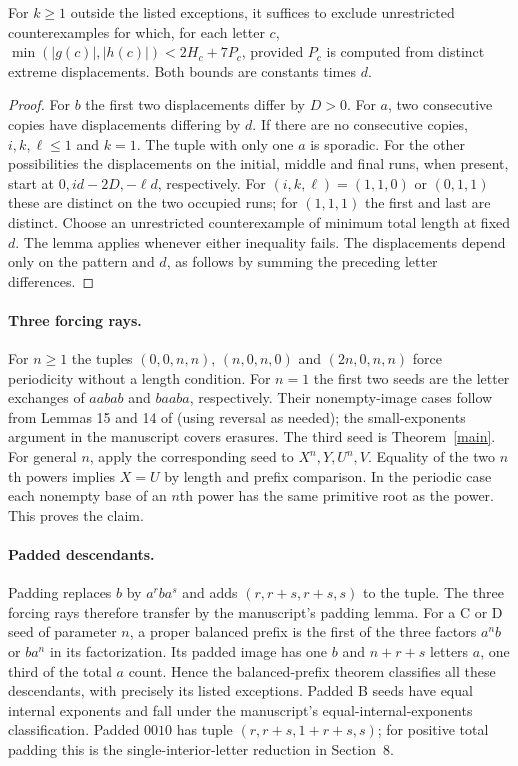 \begin{corollary}
For $k\ge1$ outside the listed exceptions, it suffices to exclude
unrestricted counterexamples for which, for each letter $c$,
$\min(|g(c)|,|h(c)|)<2H_c+7P_c$, provided $P_c$ is computed from
distinct extreme displacements. Both bounds are constants times $d$.
\end{corollary}
\begin{proof}
For $b$ the first two displacements differ by $D>0$.
For $a$, two consecutive copies have displacements differing by $d$.
If there are no consecutive copies, $i,k,\ell\le1$ and $k=1$.
The tuple with only one $a$ is sporadic. For the other possibilities
the displacements on the initial, middle and final runs, when present,
start at $0,id-2D,-\ell d$, respectively. For $(i,k,\ell)=(1,1,0)$
or $(0,1,1)$ these are distinct on the two occupied runs; for
$(1,1,1)$ the first and last are distinct.
Choose an unrestricted counterexample of minimum total length at fixed
$d$. The lemma applies whenever either inequality fails. The displacements
depend only on the pattern and $d$, as follows by summing the preceding
letter differences.
\end{proof}

\paragraph{Three forcing rays.}
For $n\ge1$ the tuples $(0,0,n,n)$, $(n,0,n,0)$ and $(2n,0,n,n)$
force periodicity without a length condition. For $n=1$ the first two
seeds are the letter exchanges of $aabab$ and $baaba$, respectively.
Their nonempty-image cases follow from Lemmas 15 and 14 of
\cite{hs} (using reversal as needed); the small-exponents argument
in the manuscript covers erasures. The third seed is Theorem~\ref{main}.
For general $n$, apply the corresponding seed to $X^n,Y,U^n,V$.
Equality of the two $n$th powers implies $X=U$ by length and prefix
comparison. In the periodic case each nonempty base of an $n$th
power has the same primitive root as the power. This proves the claim.

\paragraph{Padded descendants.}
Padding replaces $b$ by $a^rba^s$ and adds $(r,r+s,r+s,s)$ to the
tuple. The three forcing rays therefore transfer by the manuscript's
padding lemma. For a C or D seed of parameter $n$, a proper balanced
prefix is the first of the three factors $a^nb$ or $ba^n$ in its
factorization. Its padded image has one $b$ and $n+r+s$ letters $a$,
one third of the total $a$ count. Hence the balanced-prefix theorem
classifies all these descendants, with precisely its listed exceptions.
Padded B seeds have equal internal exponents and fall under the
manuscript's equal-internal-exponents classification. Padded $0010$
has tuple $(r,r+s,1+r+s,s)$; for positive total padding this is
the single-interior-letter reduction in Section~8.

